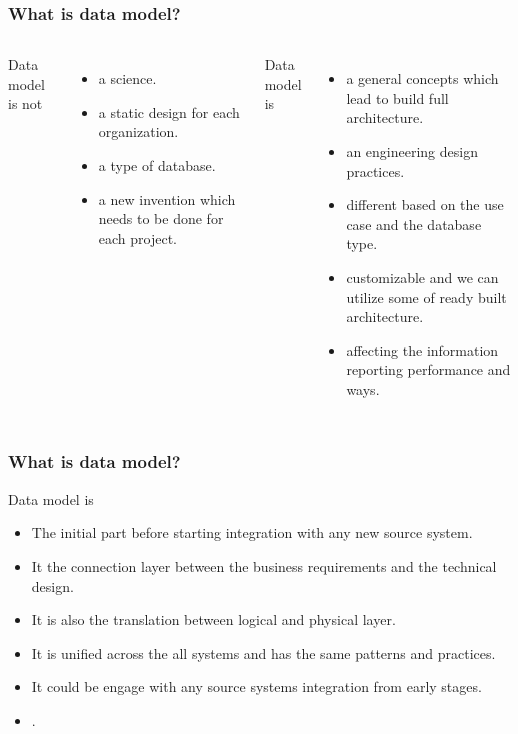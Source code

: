 \begin{frame}
\frametitle{What is data model?}

\begin{columns}

Data model is not	
\begin{itemize}
	\item a science.
	\item a static design for each organization.
	\item a type of database.
	\item a new invention which needs to be done for each project. %
\end{itemize}


Data model is		
\begin{itemize}
	\item a general concepts which lead to build full architecture.
	\item an engineering design practices.
	\item different based on the use case and the database type.
	\item customizable and we can utilize some of ready built architecture.
	\item affecting the information reporting performance and ways.
\end{itemize}

\end{columns}

\end{frame}


\begin{frame}
\frametitle{What is data model?}
Data model is
\begin{itemize}[<+->]
	\item The initial part before starting integration with any new source system.
	\item It the connection layer between the business requirements and the technical design.
	\item It is also the translation between logical and physical layer.
	\item It is unified across the all systems and has the same patterns and practices.
	\item It could be engage with any source systems integration from early stages.
	\item {}.
\end{itemize}
\end{frame}

